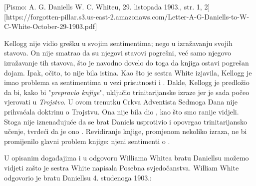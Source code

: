 
[Pismo: A. G. Daniells W. C. Whiteu, 29. listopada 1903., str. 1, 2][https://forgotten-pillar.s3.us-east-2.amazonaws.com/Letter-A-G-Daniells-to-W-C-White-October-29-1903.pdf]

Kellogg nije vidio grešku u svojim sentimentima; nego u izražavanju svojih stavova. On nije smatrao da su njegovi stavovi pogrešni, već samo njegovo izražavanje tih stavova, što je navodno dovelo do toga da knjiga ostavi pogrešan dojam. Ipak, očito, to nije bila istina. Kao što je sestra White izjavila, Kellogg je imao problema sa sentimentima u vezi prisutnosti i . Dakle, Kellogg je predložio da bi, kako bi "\textit{prepravio knjige}", uključio trinitarijanske izraze jer je sada počeo vjerovati u \textit{Trojstvo}. U ovom trenutku Crkva Adventista Sedmoga Dana nije prihvaćala doktrinu o Trojstvu. Ona nije bila dio , kao što smo ranije vidjeli. Stoga nije iznenađujuće da se brat Daniels usprotivio i opovrgao trinitarijansko učenje, tvrdeći da je ono . Revidiranje knjige, promjenom nekoliko izraza, ne bi promijenilo glavni problem knjige: njeni sentimenti o .

U opisanim događajima i u odgovoru Williama Whitea bratu Daniellsu možemo vidjeti zašto je sestra White napisala Posebna svjedočanstva. William White odgovorio je bratu Daniellsu 4. studenoga 1903.:




